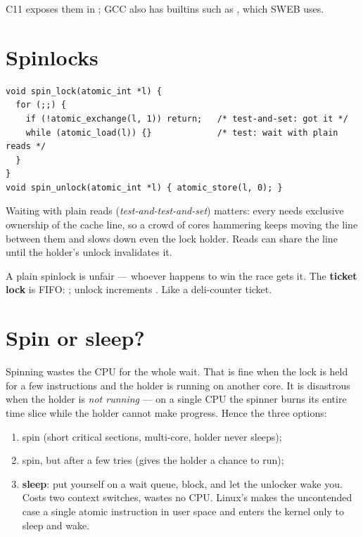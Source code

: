C11 exposes them in ; GCC also has builtins such as
, which SWEB uses.

\section{Spinlocks}

\begin{lstlisting}
void spin_lock(atomic_int *l) {
  for (;;) {
    if (!atomic_exchange(l, 1)) return;   /* test-and-set: got it */
    while (atomic_load(l)) {}             /* test: wait with plain reads */
  }
}
void spin_unlock(atomic_int *l) { atomic_store(l, 0); }
\end{lstlisting}

Waiting with plain reads (\emph{test-and-test-and-set}) matters: every
 needs exclusive ownership of the cache line, so a crowd of
cores hammering  keeps moving the line between them and slows
down even the lock holder. Reads can share the line until the holder's
unlock invalidates it.

A plain spinlock is unfair --- whoever happens to win the race gets it.
The \textbf{ticket lock} is FIFO: ; unlock increments . Like a
deli-counter ticket.

\section{Spin or sleep?}

Spinning wastes the CPU for the whole wait. That is fine when the lock is
held for a few instructions and the holder is running on another core.
It is disastrous when the holder is \emph{not running} --- on a single
CPU the spinner burns its entire time slice while the holder cannot make
progress. Hence the three options:

\begin{enumerate}
  \item spin (short critical sections, multi-core, holder never sleeps);
  \item spin, but  after a few tries (gives the holder a chance
    to run);
  \item \textbf{sleep}: put yourself on a wait queue, block, and let the
    unlocker wake you. Costs two context switches, wastes no CPU. Linux's
     makes the uncontended case a single atomic instruction in
    user space and enters the kernel only to sleep and wake.
\end{enumerate}

